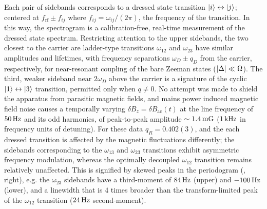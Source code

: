 \documentclass[aps,prl,reprint,superscriptaddress,floatfix]{revtex4-1}
\begin{document}
Each pair of sidebands corresponds to a dressed state transition $\vert i \rangle  \leftrightarrow \vert j \rangle $; centered at $f_{\text{rf}} \pm f_{ij}$ where $f_{ij} = \omega_{ij}/(2\pi)$, the frequency of the transition.
In this way, the spectrogram is a calibration-free, real-time measurement of the dressed state spectrum.
Restricting attention to the upper sidebands, the two closest to the carrier are ladder-type transitions $\omega_{12}$ and $\omega_{23}$ have similar amplitudes and lifetimes, with frequency separations $\omega_D \pm q_D$ from the carrier, respectively, for near-resonant coupling of the bare Zeeman states ($\vert \Delta \vert  \ll \Omega$).
The third, weaker sideband near $2\omega_D$ above the carrier is a signature of the cyclic $\vert 1 \rangle  \leftrightarrow \vert 3 \rangle $ transition, permitted only when $q\neq 0$.
No attempt was made to shield the apparatus from parasitic magnetic fields, and mains power induced magnetic field noise causes a temporally varying $\delta B_z = \delta B_{\text{ac}}(t)$ at the line frequency of $\unit[50]{Hz}$ and its odd harmonics, of peak-to-peak amplitude $\sim\unit[1.4]{mG}$ ($\unit[1]{kHz}$ in frequency units of detuning).
For these data $q_R = 0.402(3)$, and the each dressed transition is affected by the magnetic fluctuations differently; the sidebands corresponding to the $\omega_{13}$ and $\omega_{23}$ transitions exhibit asymmetric frequency modulation, whereas the optimally decoupled $\omega_{12}$ transition remains relatively unaffected.
This is signified by skewed peaks in the periodogram (, right), e.g. the $\omega_{23}$ sidebands have a third-moment of $\unit[84]{Hz}$ (upper) and $-\unit[100]{Hz}$ (lower), and a linewidth that is $4$ times broader than the transform-limited peak of the $\omega_{12}$ transition ($\unit[24]{Hz}$ second-moment).
\end{document}
